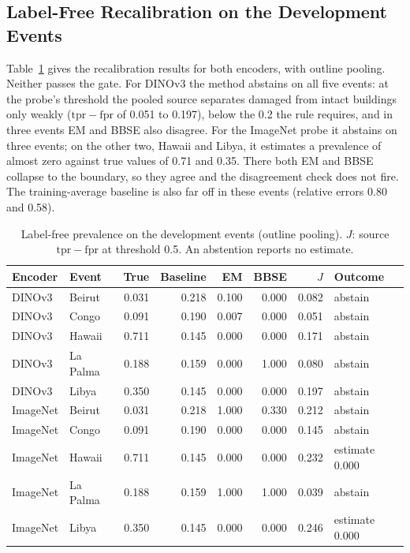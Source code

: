 \documentclass{ieeeaccess}
\begin{document}
\subsection{Label-Free Recalibration on the Development Events}
\label{sec:res-c3}
Table~\ref{tab:c3} gives the recalibration results for both encoders, with outline pooling. Neither passes the gate. For DINOv3 the method abstains on all five events: at the probe's threshold the pooled source separates damaged from intact buildings only weakly ($\mathrm{tpr}-\mathrm{fpr}$ of 0.051 to 0.197), below the 0.2 the rule requires, and in three events EM and BBSE also disagree. For the ImageNet probe it abstains on three events; on the other two, Hawaii and Libya, it estimates a prevalence of almost zero against true values of 0.71 and 0.35. There both EM and BBSE collapse to the boundary, so they agree and the disagreement check does not fire. The training-average baseline is also far off in these events (relative errors 0.80 and 0.58).

\begin{table}[t]
\centering
\caption{Label-free prevalence on the development events (outline pooling). $J$: source $\mathrm{tpr}-\mathrm{fpr}$ at threshold 0.5. An abstention reports no estimate.}
\label{tab:c3}
\footnotesize
\setlength{\tabcolsep}{2.5pt}
\begin{tabular}{@{}llrrrrrl@{}}
\toprule
Encoder & Event & True & Baseline & EM & BBSE & $J$ & Outcome \\
\midrule
DINOv3 & Beirut & 0.031 & 0.218 & 0.100 & 0.000 & 0.082 & abstain \\
DINOv3 & Congo & 0.091 & 0.190 & 0.007 & 0.000 & 0.051 & abstain \\
DINOv3 & Hawaii & 0.711 & 0.145 & 0.000 & 0.000 & 0.171 & abstain \\
DINOv3 & La Palma & 0.188 & 0.159 & 0.000 & 1.000 & 0.080 & abstain \\
DINOv3 & Libya & 0.350 & 0.145 & 0.000 & 0.000 & 0.197 & abstain \\
\midrule
ImageNet & Beirut & 0.031 & 0.218 & 1.000 & 0.330 & 0.212 & abstain \\
ImageNet & Congo & 0.091 & 0.190 & 0.000 & 0.000 & 0.145 & abstain \\
ImageNet & Hawaii & 0.711 & 0.145 & 0.000 & 0.000 & 0.232 & estimate 0.000 \\
ImageNet & La Palma & 0.188 & 0.159 & 1.000 & 1.000 & 0.039 & abstain \\
ImageNet & Libya & 0.350 & 0.145 & 0.000 & 0.000 & 0.246 & estimate 0.000 \\
\bottomrule
\end{tabular}
\end{table}
\end{document}
